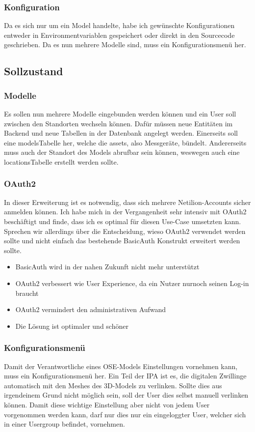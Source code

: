 \subsubsection{Konfiguration}
Da es sich nur um ein Model handelte, habe ich gewünschte Konfigurationen entweder in Environmentvariablen gespeichert oder direkt in den Sourcecode geschrieben. Da es nun mehrere Modelle sind, muss ein Konfigurationsmenü her.
\subsection{Sollzustand} \label{soll-zustand}
\subsubsection{Modelle}
Es sollen nun mehrere Modelle eingebunden werden können und ein User soll zwischen den Standorten wechseln können. Dafür müssen neue Entitäten im Backend und neue Tabellen in der Datenbank angelegt werden. Einerseits soll eine \flqq models\frqq Tabelle her, welche die \flqq assets\frqq , also Messgeräte, bündelt. Andererseits muss auch der Standort des Models abrufbar sein können, weswegen auch eine \flqq locations\frqq Tabelle erstellt werden sollte.
\subsubsection{OAuth2}
In dieser Erweiterung ist es notwendig, dass sich mehrere Netilion-Accounts sicher anmelden können. Ich habe mich in der Vergangenheit sehr intensiv mit OAuth2 beschäftigt und finde, dass ich es optimal für diesen Use-Case umsetzten kann. Sprechen wir allerdings über die Entscheidung, wieso OAuth2 verwendet werden sollte und nicht einfach das bestehende BasicAuth Konstrukt erweitert werden sollte.
\begin{itemize}
  \item BasicAuth wird in der nahen Zukunft nicht mehr unterstützt
  \item OAuth2 verbessert wie User Experience, da ein Nutzer nurnoch seinen Log-in braucht
  \item OAuth2 vermindert den administrativen Aufwand
  \item Die Lösung ist optimaler und schöner
\end{itemize}
\subsubsection{Konfigurationsmenü}
Damit der Verantwortliche eines OSE-Models Einstellungen vornehmen kann, muss ein Konfigurationsmenü her. Ein Teil der IPA ist es, die digitalen Zwillinge automatisch mit den Meshes des 3D-Models zu verlinken. Sollte dies aus irgendeinem Grund nicht möglich sein, soll der User dies selbst manuell verlinken können. Damit diese wichtige Einstellung aber nicht von jedem User vorgenommen werden kann, darf nur dies nur ein eingeloggter User, welcher sich in einer Usergroup befindet, vornehmen.
